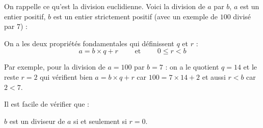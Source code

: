 \documentclass[11pt,class=report,crop=false]{standalone}
\begin{document}








\begin{cours}[Arithmétique]

\index{\ci{//}}
\index{\ci{\%}}

On rappelle ce qu'est la division euclidienne. Voici la division de $a$ par $b$, $a$ est un entier positif, $b$ est un entier strictement positif (avec un exemple de $100$ divisé par $7$) :


On a les deux propriétés fondamentales qui définissent $q$ et $r$ :
$$a = b \times q  + r \qquad \text{ et } \qquad 0 \le r < b$$

Par exemple, pour la division de $a=100$ par $b=7$ : on a le quotient $q=14$ et le reste $r=2$ qui vérifient bien $a = b \times q  + r$ car $100 = 7 \times 14 + 2$  et aussi $r<b$ car $2<7$.


Il est facile de vérifier que :\\
\centerline{$b$ est un diviseur de $a$ si et seulement si $r=0$.}

\end{cours}
\end{document}
